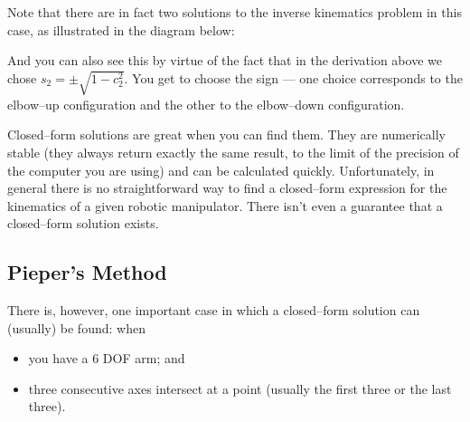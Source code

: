\documentclass[]{article}
\begin{document}
Note that there are in fact two solutions to the inverse kinematics problem in this case, as illustrated in the diagram below:
 
\begin{figure}[h!]
 	\centering
 \end{figure}

And you can also see this by virtue of the fact that in the derivation above we chose $s_{2} = \pm \sqrt{1-c_{2}^{2}}$. You get to choose the sign --- one choice corresponds to the elbow--up configuration and the other to the elbow--down configuration.

Closed--form solutions are great when you can find them. They are numerically stable (they always return exactly the same result, to the limit of the precision of the computer you are using) and can be calculated quickly. Unfortunately, in general there is no straightforward way to find a closed--form expression for the kinematics of a given robotic manipulator. There isn't even a guarantee that a closed--form solution exists.

 
\subsection{Pieper's Method}
There is, however, one important case in which a closed--form solution can (usually) be found: when \begin{itemize} \item you have a 6 DOF arm; and \item three consecutive axes intersect at a point (usually the first three or the last three).\end{itemize}
\end{document}
